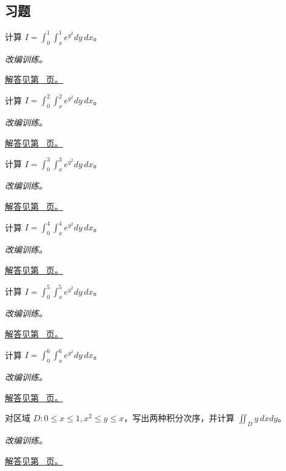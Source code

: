 \documentclass[UTF8,12pt,a4paper,fontset=fandol]{ctexart}
\begin{document}
\subsection{习题}
\begin{example}[非初等内积分的换序]\label{ex:c37q1}
计算 $I=\displaystyle\int_0^{1}\int_x^{1}e^{y^2}dy\,dx$。
\par\textit{改编训练。}\par\hyperref[ans:c37q1]{解答见第~\pageref{ans:c37q1} 页。}
\end{example}
\begin{example}[非初等内积分的换序]\label{ex:c37q2}
计算 $I=\displaystyle\int_0^{2}\int_x^{2}e^{y^2}dy\,dx$。
\par\textit{改编训练。}\par\hyperref[ans:c37q2]{解答见第~\pageref{ans:c37q2} 页。}
\end{example}
\begin{example}[非初等内积分的换序]\label{ex:c37q3}
计算 $I=\displaystyle\int_0^{3}\int_x^{3}e^{y^2}dy\,dx$。
\par\textit{改编训练。}\par\hyperref[ans:c37q3]{解答见第~\pageref{ans:c37q3} 页。}
\end{example}
\begin{example}[非初等内积分的换序]\label{ex:c37q4}
计算 $I=\displaystyle\int_0^{4}\int_x^{4}e^{y^2}dy\,dx$。
\par\textit{改编训练。}\par\hyperref[ans:c37q4]{解答见第~\pageref{ans:c37q4} 页。}
\end{example}
\begin{example}[非初等内积分的换序]\label{ex:c37q5}
计算 $I=\displaystyle\int_0^{5}\int_x^{5}e^{y^2}dy\,dx$。
\par\textit{改编训练。}\par\hyperref[ans:c37q5]{解答见第~\pageref{ans:c37q5} 页。}
\end{example}
\begin{example}[非初等内积分的换序]\label{ex:c37q6}
计算 $I=\displaystyle\int_0^{6}\int_x^{6}e^{y^2}dy\,dx$。
\par\textit{改编训练。}\par\hyperref[ans:c37q6]{解答见第~\pageref{ans:c37q6} 页。}
\end{example}
\begin{example}[两条曲线之间的换序]\label{ex:c37q7}
对区域 $D:0\le x\le1, x^{2}\le y\le x$，写出两种积分次序，并计算 $\iint_Dy\,dxdy$。
\par\textit{改编训练。}\par\hyperref[ans:c37q7]{解答见第~\pageref{ans:c37q7} 页。}
\end{example}
\end{document}
